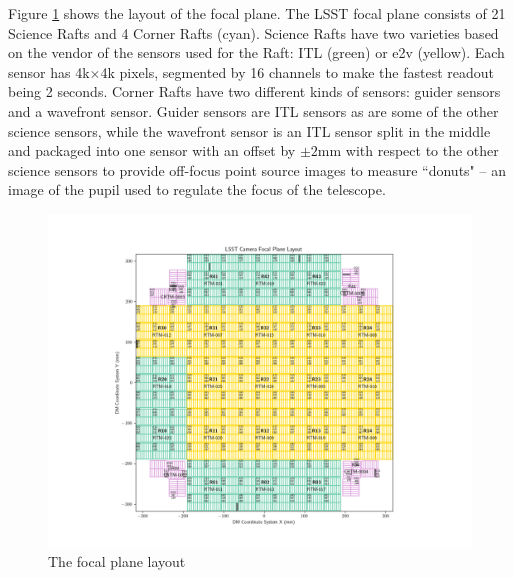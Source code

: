 Figure \ref{fig:focal-plane-layout} shows the layout of the focal plane. The LSST focal plane consists of 21 Science Rafts and 4 Corner Rafts (cyan). Science Rafts have two varieties based on the vendor of the sensors used for the Raft: ITL (green) or e2v (yellow). Each sensor has 4k$\times$4k pixels, segmented by 16 channels to make the fastest readout being 2 seconds. Corner Rafts have two different kinds of sensors: guider sensors and a wavefront sensor. Guider sensors are ITL sensors as are some of the other science sensors, while the wavefront sensor is an ITL sensor split in the middle and packaged into one sensor with an offset by $\pm2$mm with respect to the other science sensors to provide off-focus point source images to measure ``donuts" -- an image of the pupil used to regulate the focus of the telescope.
\begin{figure}
    \centering
    \includegraphics[width=1.0\linewidth]{figures/introduction/LSSTCam_fp_layout_Oct2024.pdf}
    \caption{The focal plane layout}
    \label{fig:focal-plane-layout}
\end{figure}

\clearpage
